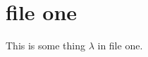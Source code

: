 \documentclass{article}
\begin{document}
\section{file one}
This is some thing $\lambda$ in file one.
\end{document}
